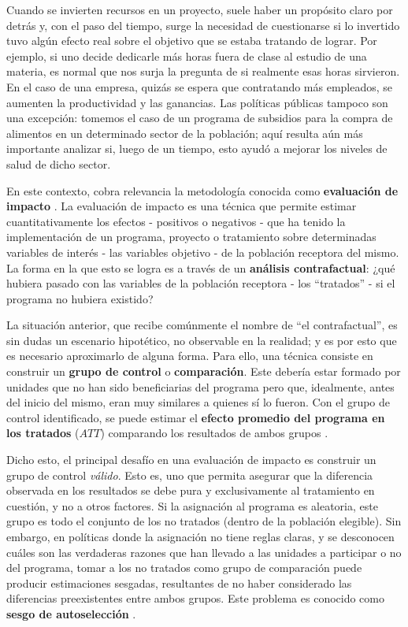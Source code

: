 \documentclass[../main.tex]{subfiles}
\begin{document}
Cuando se invierten recursos en un proyecto, suele haber un propósito claro por detrás y,
con el paso del tiempo, surge la necesidad de cuestionarse si lo invertido tuvo algún
efecto real sobre el objetivo que se estaba tratando de lograr. Por ejemplo, si uno decide
dedicarle más horas fuera de clase al estudio de una materia, es normal que nos surja la
pregunta de si realmente esas horas sirvieron. En el caso de una empresa, quizás se espera
que contratando más empleados, se aumenten la productividad y las ganancias. Las políticas
públicas tampoco son una excepción: tomemos el caso de un programa de subsidios para la
compra de alimentos en un determinado sector de la población; aquí resulta aún más
importante analizar si, luego de un tiempo, esto ayudó a mejorar los niveles de salud de
dicho sector.

En este contexto, cobra relevancia la metodología conocida como \textbf{evaluación de
impacto} \cite{bernal}\cite{gertler-2016}. La evaluación de impacto es una técnica que
permite estimar cuantitativamente los efectos - positivos o negativos - que ha tenido la
implementación de un programa, proyecto o tratamiento sobre determinadas variables de
interés - las variables objetivo - de la población receptora del mismo. La forma en la que
esto se logra es a través de un \textbf{análisis contrafactual}: ¿qué hubiera pasado con
las variables de la población receptora - los ``tratados'' - si el programa no hubiera
existido?

La situación anterior, que recibe comúnmente el nombre de ``el contrafactual'', es sin
dudas un escenario hipotético, no observable en la realidad; y es por esto que es
necesario aproximarlo de alguna forma. Para ello, una técnica consiste en construir un
\textbf{grupo de control} o \textbf{comparación}. Este debería estar formado por unidades
que no han sido beneficiarias del programa pero que, idealmente, antes del inicio del
mismo, eran muy similares a quienes sí lo fueron. Con el grupo de control identificado, se
puede estimar el \textbf{efecto promedio del programa en los tratados} (\(ATT\))
comparando los resultados de ambos grupos \cite{rubin1974}.

Dicho esto, el principal desafío en una evaluación de impacto es construir un grupo de
control \textit{válido}. Esto es, uno que permita asegurar que la diferencia observada en
los resultados se debe pura y exclusivamente al tratamiento en cuestión, y no a otros
factores. Si la asignación al programa es aleatoria, este grupo es todo el conjunto de los
no tratados (dentro de la población elegible). Sin embargo, en políticas donde la
asignación no tiene reglas claras, y se desconocen cuáles son las verdaderas razones que
han llevado a las unidades a participar o no del programa, tomar a los no tratados como
grupo de comparación puede producir estimaciones sesgadas, resultantes de no haber
considerado las diferencias preexistentes entre ambos grupos. Este problema es conocido
como \textbf{sesgo de autoselección} \cite{bernal}\cite{mostly-harmless-econometrics}.
\end{document}
